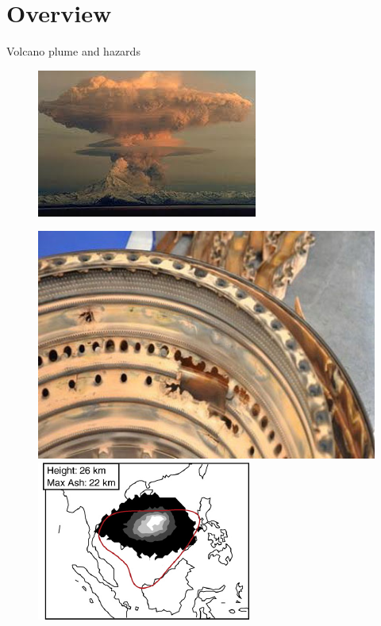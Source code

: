 \documentclass{beamer}
\begin{document}
\section{Overview}
\begin{frame}{Volcano plume and hazards}
\noindent

\begin{figure}[!t]
\centering
\begin{minipage}{.40\textwidth}
\center
\includegraphics[width=.98\textwidth]{./PPT/Plume_pic}
\end{minipage}
\begin{minipage}{.59\textwidth}
\center
\includegraphics[width=.49\textwidth]{./PPT/BA-engine}
\includegraphics[width=.49\textwidth]{./PPT/Pinatubo-FeCaME}
\end{minipage}
\\

\end{figure}
\end{frame}
\end{document}
